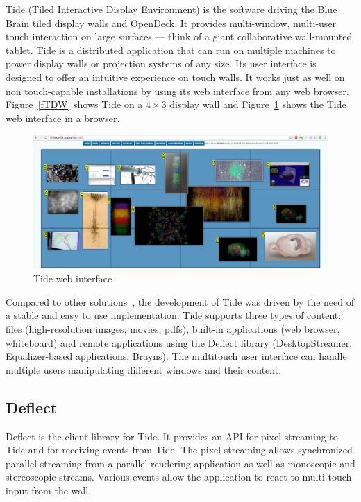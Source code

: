 \documentclass[10pt]{llncs}
\newcommand{\fig}[1]{Figure~\ref{#1}}
\begin{document}
Tide (Tiled Interactive Display Environment) is the software driving the Blue
Brain tiled display walls and OpenDeck. It provides multi-window, multi-user
touch interaction on large surfaces --- think of a giant collaborative
wall-mounted tablet. Tide is a distributed application that can run on multiple
machines to power display walls or projection systems of any size. Its user
interface is designed to offer an intuitive experience on touch walls. It works
just as well on non touch-capable installations by using its web interface from
any web browser. \fig{fTDW} shows Tide on a $4\times 3$ display wall and
\fig{fTideWeb} shows the Tide web interface in a browser.

\begin{figure}[h!t]
  \includegraphics[width=\columnwidth]{images/tideweb}
  \caption{\label{fTideWeb}Tide web interface}
\end{figure}

Compared to other solutions~\cite{Sage,Sage2,DisplayCluster}, the development of
Tide was driven by the need of a stable and easy to use implementation. Tide
supports three types of content: files (high-resolution images, movies, pdfs),
built-in applications (web browser, whiteboard) and remote applications using
the Deflect library (DesktopStreamer, Equalizer-based applications, Brayns).
The multitouch user interface can handle multiple users manipulating different
windows and their content.

\subsection{Deflect}

Deflect is the client library for Tide. It provides an API for pixel streaming
to Tide and for receiving events from Tide. The pixel streaming allows
synchronized parallel streaming from a parallel rendering application as well as
monoscopic and stereoscopic streams. Various events allow the application to
react to multi-touch input from the wall.
\end{document}
